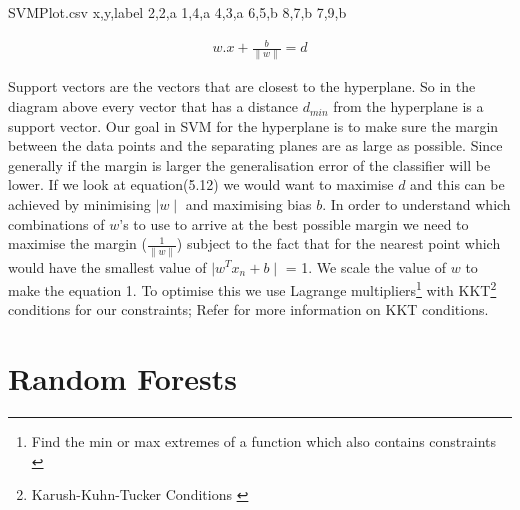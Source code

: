 \begin{filecontents*}{SVMPlot.csv}
x,y,label
2,2,a
1,4,a
4,3,a
6,5,b
8,7,b
7,9,b
\end{filecontents*}
\begin{gather}
w.x + \frac{b}{\parallel w \parallel} = d
\end{gather}

\noindent
Support vectors are the vectors that are closest to the hyperplane. So in the diagram above every vector that has a distance $d_{min}$ from the hyperplane is a support vector. Our goal in SVM for the hyperplane is to make sure the margin between the data points and the separating planes are as large as possible. Since generally if the margin is larger the generalisation error of the classifier will be lower. If we look at equation(5.12) we would want to maximise $d$ and this can be achieved by minimising $\mid w \mid$ and maximising bias $b$. 
In order to understand which combinations of $w$'s to use to arrive at the best possible margin we need to maximise the margin ($\frac {1}{\parallel w \parallel}$) subject to the fact that for the nearest point which would have the smallest value of $\mid w^Tx_n + b \mid$ = 1. We scale the value of $w$ to make the equation 1. To optimise this we use Lagrange multipliers\footnote{Find the min or max extremes of a function which also contains constraints \cite{32}} with KKT\footnote{Karush-Kuhn-Tucker Conditions \cite{32}} conditions for our constraints; Refer \cite{32} for more information on KKT conditions. 

\newpage
\section{Random Forests}

